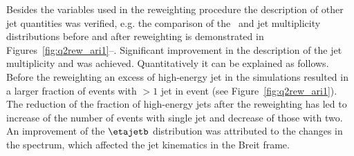 Besides the variables used in the reweighting procedure the description of other jet quantities was verified, e.g. the comparison of the \etajetb~and jet multiplicity distributions before and after reweighting is demonstrated in Figures~\ref{fig:q2rew_ari1}--. Significant improvement in the description of the jet multiplicity and \etajetb was achieved. Quantitatively it can be explained as follows. Before the reweighting an excess of high-energy jet in the simulations resulted in a larger fraction of events with $> 1$ jet in event (see Figure~\ref{fig:q2rew_ari1}). The reduction of the fraction of high-energy jets after the reweighting has led to increase of the number of events with single jet and decrease of those with two. An improvement of the $\etajetb$ distribution was attributed to the changes in the \qsq spectrum, which affected the jet kinematics in the Breit frame.
